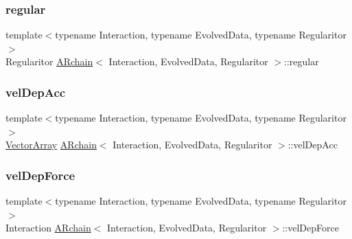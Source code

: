 \mbox{\label{class_a_rchain_a4dd20aa56d6a6403260ad3ced2987eb0}} 
\subsubsection{\texorpdfstring{regular}{regular}}
{\footnotesize\ttfamily template$<$typename Interaction, typename Evolved\+Data, typename Regularitor$>$ \\
Regularitor \mbox{\hyperlink{class_a_rchain}{A\+Rchain}}$<$ Interaction, Evolved\+Data, Regularitor $>$\+::regular\hspace{0.3cm}{\ttfamily [private]}}

\mbox{\label{class_a_rchain_a3c3a74f839bbfe5cbe1d8eb239dd8cc1}} 
\subsubsection{\texorpdfstring{vel\+Dep\+Acc}{velDepAcc}}
{\footnotesize\ttfamily template$<$typename Interaction, typename Evolved\+Data, typename Regularitor$>$ \\
\mbox{\hyperlink{class_a_rchain_a019fbadb9f4e5892736d9127537338bb}{Vector\+Array}} \mbox{\hyperlink{class_a_rchain}{A\+Rchain}}$<$ Interaction, Evolved\+Data, Regularitor $>$\+::vel\+Dep\+Acc\hspace{0.3cm}{\ttfamily [private]}}

\mbox{\label{class_a_rchain_a5ad11cefbdb69a58225b799b36dd9eee}} 
\subsubsection{\texorpdfstring{vel\+Dep\+Force}{velDepForce}}
{\footnotesize\ttfamily template$<$typename Interaction, typename Evolved\+Data, typename Regularitor$>$ \\
Interaction \mbox{\hyperlink{class_a_rchain}{A\+Rchain}}$<$ Interaction, Evolved\+Data, Regularitor $>$\+::vel\+Dep\+Force\hspace{0.3cm}{\ttfamily [private]}}

